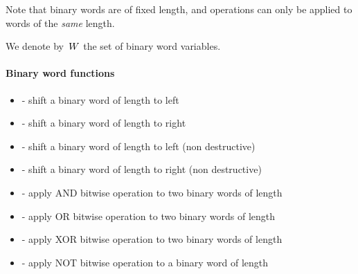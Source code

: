 Note that binary words are of fixed length, and operations can only be applied to words of the \emph{same} length.

We denote by~$W$ the set of binary word variables.



\paragraph{Binary word functions}

\begin{itemize}
    \item \label{item:lbl-shift_left}  - shift a binary word of length  to left
		\item \label{item:lbl-shift_right}  - shift a binary word of length  to right
		\item \label{item:lbl-fill_left}  - shift a binary word of length  to left (non destructive)
		\item \label{item:lbl-fill_right}  - shift a binary word of length  to right (non destructive)
		\item \label{item:lbl-logand}  - apply AND bitwise operation to two binary words of length 
		\item \label{item:lbl-logor}  - apply OR bitwise operation to two binary words of length 
		\item \label{item:lbl-logxor}  - apply XOR bitwise operation to two binary words of length 
		\item \label{item:lbl-lognot}  - apply NOT bitwise operation to a binary word of length 
\end{itemize}

